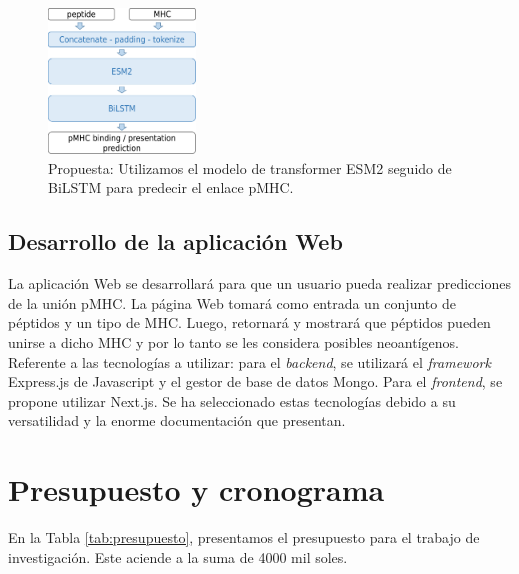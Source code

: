 \documentclass[a4paper]{article}
\begin{document}
\begin{figure}[H]
	\centering
	\includegraphics[width=0.35\textwidth]{img/neoantigen/proposal1}
	\caption{Propuesta: Utilizamos el modelo de transformer ESM2 seguido de BiLSTM para predecir el enlace pMHC.}
	\label{fig:proposal}
\end{figure}

\subsection{Desarrollo de la aplicación Web}

La aplicación Web se desarrollará para que un usuario pueda realizar predicciones de la unión pMHC. La página Web tomará como entrada un conjunto de péptidos y un tipo de MHC. Luego, retornará y mostrará que péptidos pueden unirse a dicho MHC y por lo tanto se les considera posibles neoantígenos.\\

Referente a las tecnologías a utilizar: para el \textit{backend}, se utilizará el \textit{framework} Express.js de Javascript y el gestor de base de datos Mongo. Para el \textit{frontend}, se propone utilizar Next.js. Se ha seleccionado estas tecnologías debido a su versatilidad y la enorme documentación que presentan.


\section{Presupuesto y cronograma}

En la Tabla \ref{tab:presupuesto}, presentamos el presupuesto para el trabajo de investigación. Este aciende a la suma de 4000 mil soles.
\end{document}
